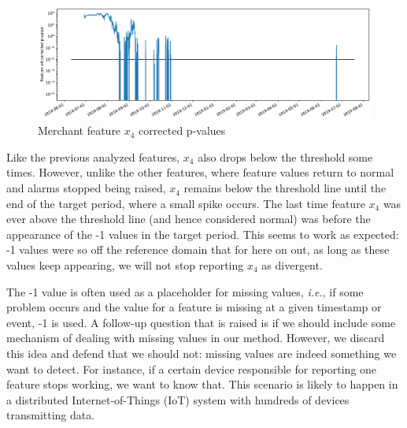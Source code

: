 \begin{figure}[!htb]
    \begin{center}
      \includegraphics[scale=0.5]{figures/merchant-x4-correctedpvalues.pdf}
      \caption{Merchant feature $x_4$ corrected p-values}
      \label{fig:merchant-x4-correctedpvalues}
    \end{center}
\end{figure}
Like the previous analyzed features, $x_4$ also drops below the threshold some times. However, unlike the other features, where feature values return to normal and alarms stopped being raised, $x_4$ remains below the threshold line until the end of the target period, where a small spike occurs. The last time feature $x_4$ was ever above the threshold line (and hence considered normal) was before the appearance of the -1 values in the target period. This seems to work as expected: -1 values were so off the reference domain that for here on out, as long as these values keep appearing, we will not stop reporting $x_4$ as divergent.

The -1 value is often used as a placeholder for missing values, \textit{i.e.}, if some problem occurs and the value for a feature is missing at a given timestamp or event, -1 is used. A follow-up question that is raised is if we should include some mechanism of dealing with missing values in our method. However, we discard this idea and defend that we should not: missing values are indeed something we want to detect. For instance, if a certain device responsible for reporting one feature stops working, we want to know that. This scenario is likely to happen in a distributed Internet-of-Things (IoT) system with hundreds of devices transmitting data. 

